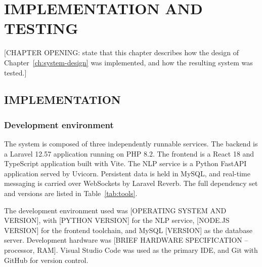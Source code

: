%
\chapter{IMPLEMENTATION AND TESTING}
\label{ch:implementation-testing}

[CHAPTER OPENING: state that this chapter describes how the design of
Chapter~\ref{ch:system-design} was implemented, and how the resulting
system was tested.]

\section{IMPLEMENTATION}
\label{sec:implementation}

\subsection{Development environment}
\label{subsec:dev-environment}

The system is composed of three independently runnable services. The
backend is a Laravel 12.57 application running on PHP 8.2. The frontend
is a React 18 and TypeScript application built with Vite. The NLP
service is a Python FastAPI application served by Uvicorn. Persistent
data is held in MySQL, and real-time messaging is carried over
WebSockets by Laravel Reverb. The full dependency set and versions are
listed in Table~\ref{tab:tools}.

The development environment used was
[OPERATING SYSTEM AND VERSION], with
[PYTHON VERSION] for the NLP service,
[NODE.JS VERSION] for the frontend toolchain, and
MySQL [VERSION] as the database server. Development hardware was
[BRIEF HARDWARE SPECIFICATION -- processor, RAM]. Visual Studio Code was
used as the primary IDE, and Git with GitHub for version control.


